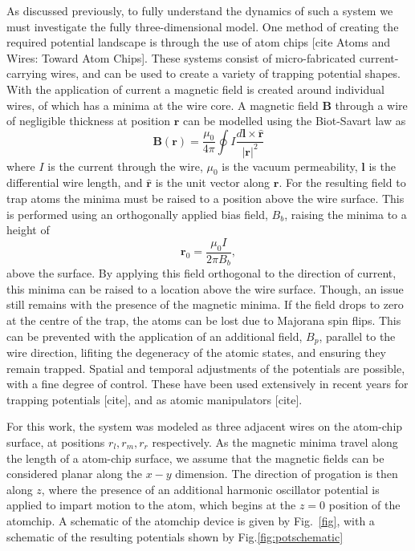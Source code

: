 As discussed previously, to fully understand the dynamics of such a system we must investigate the fully three-dimensional model. One method of creating the required potential landscape is through the use of atom chips \cite{Bartenstein_ieee_2000}[cite Atoms and Wires: Toward Atom Chips]. These systems consist of micro-fabricated current-carrying wires, and can be used to create a variety of trapping potential shapes. With the application of current a magnetic field is created around individual wires, of which has a minima at the wire core. A magnetic field $\mathbf{B}$ through a wire of negligible thickness at position $\mathbf{r}$ can be modelled using the Biot-Savart law as
\begin{equation}
    \mathbf{B}(\mathbf{r}) = \frac{\mu_0}{4\pi}\oint I \frac{d\mathbf{l}\times \hat{\mathbf{r}}}{|\mathbf{r}|^2}
\end{equation}
where $I$ is the current through the wire, $\mu_0$ is the vacuum permeability, $\mathbf{l}$ is the differential wire length, and $\hat{\mathbf{r}}$ is the unit vector along $\mathbf{r}$. For the resulting field to trap atoms the minima must be raised to a position above the wire surface. This is performed using an orthogonally applied bias field, ${B}_b$, raising the minima to a height of
\begin{equation}
    \mathbf{r}_0 = \frac{\mu_0 I}{2\pi {B}_b},
\end{equation}
above the surface. By applying this field orthogonal to the direction of current, this minima can be raised to a location above the wire surface. Though, an issue still remains with the presence of the magnetic minima. If the field drops to zero at the centre of the trap, the atoms can be lost due to Majorana spin flips. This can be prevented with the application of an additional field, ${B}_{p}$, parallel to the wire direction, lifiting the degeneracy of the atomic states, and ensuring they remain trapped. Spatial and temporal adjustments of the potentials are possible, with a fine degree of control. These have been used extensively in recent years for trapping potentials [cite], and as atomic manipulators [cite].

For this work, the system was modeled as three adjacent wires on the atom-chip surface, at positions $r_l, r_m, r_r$ respectively. As the magnetic minima travel along the length of a atom-chip surface, we assume that the magnetic fields can be considered planar along the $x-y$ dimension. The direction of progation is then along $z$, where the presence of an additional harmonic oscillator potential is applied to impart motion to the atom, which begins at the $z=0$ position of the atomchip. A schematic of the atomchip device is given by Fig.~\ref{fig}, with a schematic of the resulting potentials shown by Fig.\ref{fig:potschematic}


